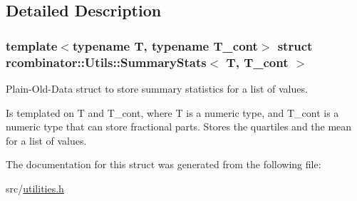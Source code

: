 \subsection{Detailed Description}
\subsubsection*{template$<$typename T, typename T\+\_\+cont$>$\newline
struct rcombinator\+::\+Utils\+::\+Summary\+Stats$<$ T, T\+\_\+cont $>$}

Plain-\/\+Old-\/\+Data struct to store summary statistics for a list of values. 

Is templated on T and T\+\_\+cont, where T is a numeric type, and T\+\_\+cont is a numeric type that can store fractional parts. Stores the quartiles and the mean for a list of values. 

The documentation for this struct was generated from the following file\+:\begin{DoxyCompactItemize}
\item 
src/\mbox{\hyperlink{utilities_8h}{utilities.\+h}}\end{DoxyCompactItemize}
